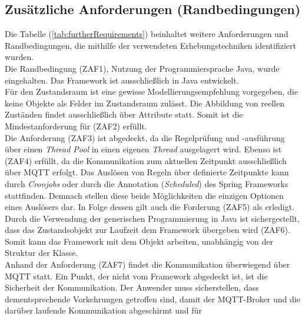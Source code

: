     \subsection*{Zusätzliche Anforderungen (Randbedingungen)}
        Die Tabelle (\ref{tab:furtherRequirements}) beinhaltet weitere Anforderungen und Randbedingungen, die mithilfe der verwendeten 
        Erhebungstechniken identifiziert wurden. 
        \\
        Die Randbedingung (ZAF1), Nutzung der Programmiersprache Java, wurde eingehalten. Das Framework ist ausschließlich in Java entwickelt. 
        \\
        Für den Zustandsraum ist eine gewisse Modellierungsempfehlung vorgegeben, die keine Objekte als Felder im Zustandsraum zulässt. Die 
        Abbildung von reellen Zuständen findet 
        ausschließlich über Attribute statt. Somit ist die Mindestanforderung für (ZAF2) erfüllt. 
        \\
        \linebreak
        Die Anforderung (ZAF3) ist abgedeckt, da die Regelprüfung und -ausführung über einen \textit{Thread Pool} in einen eigenen \textit{Thread} ausgelagert wird. Ebenso 
        ist (ZAF4) erfüllt, da die Kommunikation zum aktuellen Zeitpunkt ausschließlich über \acs{MQTT} erfolgt. Das Auslösen von Regeln über definierte Zeitpunkte kann durch 
        \textit{Cronjobs} oder durch die Annotation (\textit{\@ Scheduled}) des Spring Frameworks stattfinden. Demnach stellen diese beide Möglichkeiten die einzigen Optionen eines 
        Auslösers dar. In Folge dessen gilt auch die Forderung (ZAF5) als erledigt.
        \\
        \linebreak
        Durch die Verwendung der generischen Programmierung in Java ist sichergestellt, dass das Zustandsobjekt zur Laufzeit dem Framework übergeben wird (ZAF6). %
        Somit kann das Framework mit dem Objekt arbeiten, unabhängig von der Struktur der Klasse.
        \\
        \linebreak
        Anhand der Anforderung (ZAF7) findet die Kommunikation überwiegend über \acs{MQTT} statt. Ein Punkt, der nicht vom Framework abgedeckt ist, ist die Sicherheit der 
        Kommunikation. Der Anwender muss sicherstellen, dass dementsprechende Vorkehrungen getroffen sind, damit der \acs{MQTT}-Broker und die darüber laufende Kommunikation abgeschirmt und für 
